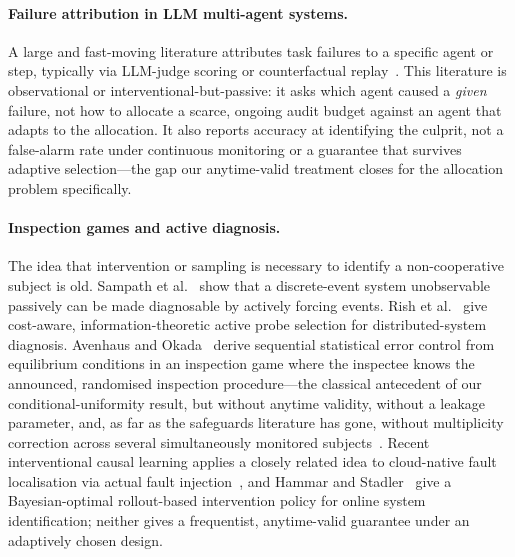 \documentclass[sigconf,anonymous]{aamas}
\theoremstyle{plain}
\theoremstyle{definition}
\begin{document}
\paragraph{Failure attribution in LLM multi-agent systems.}
A large and fast-moving literature attributes task failures to a specific
agent or step, typically via LLM-judge scoring or counterfactual
replay~\cite{whoandwhen2025,traceelephant2026}. This literature is
observational or interventional-but-passive: it asks which agent caused a
\emph{given} failure, not how to allocate a scarce, ongoing audit budget
against an agent that adapts to the allocation. It also reports accuracy at
identifying the culprit, not a false-alarm rate under continuous monitoring
or a guarantee that survives adaptive selection---the gap our anytime-valid
treatment closes for the allocation problem specifically.

\paragraph{Inspection games and active diagnosis.}
The idea that intervention or sampling is necessary to identify a
non-cooperative subject is old. Sampath et al.~\cite{sampath1998active}
show that a discrete-event system unobservable passively can be made
diagnosable by actively forcing events. Rish et al.~\cite{rish2005adaptive}
give cost-aware, information-theoretic active probe selection for
distributed-system diagnosis. Avenhaus and
Okada~\cite{avenhaus1992statistical} derive sequential statistical error
control from equilibrium conditions in an inspection game where the
inspectee knows the announced, randomised inspection procedure---the
classical antecedent of our conditional-uniformity result, but without
anytime validity, without a leakage parameter, and, as far as the safeguards
literature has gone, without multiplicity correction across several
simultaneously monitored subjects~\cite{hohzaki2007inspection,vonstengel2016recursive}.
Recent interventional causal learning applies a closely related idea to
cloud-native fault localisation via actual fault
injection~\cite{wang2023faultinjection,jha2024faultlocalization}, and
Hammar and Stadler~\cite{hammar2025online} give a Bayesian-optimal
rollout-based intervention policy for online system identification; neither
gives a frequentist, anytime-valid guarantee under an adaptively chosen
design.
\end{document}

